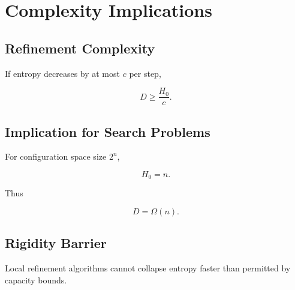 \chapter{Complexity Implications}

\section{Refinement Complexity}

If entropy decreases by at most \(c\) per step,

\[
D \ge \frac{H_0}{c}.
\]

\section{Implication for Search Problems}

For configuration space size \(2^n\),

\[
H_0 = n.
\]

Thus

\[
D = \Omega(n).
\]

\section{Rigidity Barrier}

Local refinement algorithms cannot collapse entropy faster than permitted by capacity bounds.
